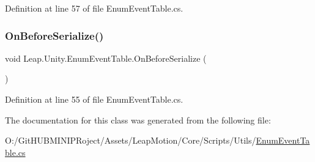 Definition at line 57 of file Enum\+Event\+Table.\+cs.

\mbox{\label{class_leap_1_1_unity_1_1_enum_event_table_aa2f8d03ec5a8d998a4a24f27eee34740}} 
\subsubsection{\texorpdfstring{OnBeforeSerialize()}{OnBeforeSerialize()}}
{\footnotesize\ttfamily void Leap.\+Unity.\+Enum\+Event\+Table.\+On\+Before\+Serialize (\begin{DoxyParamCaption}{ }\end{DoxyParamCaption})}



Definition at line 55 of file Enum\+Event\+Table.\+cs.



The documentation for this class was generated from the following file\+:\begin{DoxyCompactItemize}
\item 
O\+:/\+Git\+H\+U\+B\+M\+I\+N\+I\+P\+Roject/\+Assets/\+Leap\+Motion/\+Core/\+Scripts/\+Utils/\mbox{\hyperlink{_enum_event_table_8cs}{Enum\+Event\+Table.\+cs}}\end{DoxyCompactItemize}
